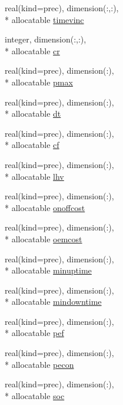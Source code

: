 \begin{DoxyCompactItemize}
real(kind=prec), dimension(\-:,\-:), \\*
allocatable \hyperlink{classplantvar_aade5aa28513690acf2cf215b0dc1acd2}{timevinc}
\item 
integer, dimension(\-:,\-:), \\*
allocatable \hyperlink{classplantvar_a01620e31bb05f1443908f0bff75215a4}{cr}
\item 
real(kind=prec), dimension(\-:), \\*
allocatable \hyperlink{classplantvar_aab06737bb534df1a69fff1f6f601a72a}{pmax}
\item 
real(kind=prec), dimension(\-:), \\*
allocatable \hyperlink{classplantvar_ae10871bcf2f4379bd15a518a314038de}{dt}
\item 
real(kind=prec), dimension(\-:), \\*
allocatable \hyperlink{classplantvar_af0df4533997b17a1fd69f0c152ce2804}{cf}
\item 
real(kind=prec), dimension(\-:), \\*
allocatable \hyperlink{classplantvar_a8c41db489c4d6b494849ab3c82833e29}{lhv}
\item 
real(kind=prec), dimension(\-:), \\*
allocatable \hyperlink{classplantvar_a2e95a86439f2372f77360c8ba1efaaff}{onoffcost}
\item 
real(kind=prec), dimension(\-:), \\*
allocatable \hyperlink{classplantvar_a70a5a58ce085d08a2b8fb1434ab5862c}{oemcost}
\item 
real(kind=prec), dimension(\-:), \\*
allocatable \hyperlink{classplantvar_aa1e10cfba7b7a224f760c1087d2add6d}{minuptime}
\item 
real(kind=prec), dimension(\-:), \\*
allocatable \hyperlink{classplantvar_a9320c1f8ded834439390cb5602c19863}{mindowntime}
\item 
real(kind=prec), dimension(\-:), \\*
allocatable \hyperlink{classplantvar_adae0478dc0dc873750b3f2ff1cd17f47}{pef}
\item 
real(kind=prec), dimension(\-:), \\*
allocatable \hyperlink{classplantvar_a5f4279bfe683122d1505b7df5897ac45}{pecon}
\item 
real(kind=prec), dimension(\-:), \\*
allocatable \hyperlink{classplantvar_abcd233bb37be100040f7c48ba5700daa}{soc}
\item 

\end{DoxyCompactItemize}
